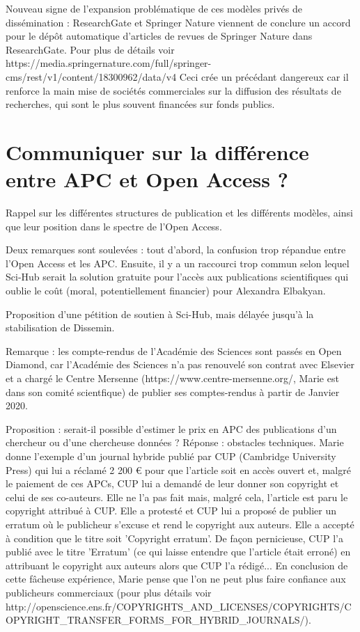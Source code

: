 \documentclass[a4paper]{article}
\begin{document}
Nouveau signe de l'expansion problématique de ces modèles privés de dissémination : ResearchGate et Springer Nature viennent de conclure un accord pour le dépôt automatique d'articles de revues de Springer Nature dans ResearchGate. Pour plus de détails voir https://media.springernature.com/full/springer-cms/rest/v1/content/18300962/data/v4
Ceci crée un précédant dangereux car il renforce la main mise de sociétés commerciales sur la diffusion des résultats de recherches, qui sont le plus souvent financées sur fonds publics.

\section{Communiquer sur la différence entre APC et Open Access ?}

Rappel sur les différentes structures de publication et les différents modèles, ainsi que leur position dans le spectre de l'Open Access.

Deux remarques sont soulevées : tout d'abord, la confusion trop répandue entre l'Open Access et les APC. Ensuite, il y a un raccourci trop commun selon lequel Sci-Hub serait la solution gratuite pour l'accès aux publications scientifiques qui oublie le coût (moral, potentiellement financier) pour Alexandra Elbakyan. 

Proposition d'une pétition de soutien à Sci-Hub, mais délayée jusqu'à la stabilisation de Dissemin. 

Remarque : les compte-rendus de l'Académie des Sciences sont passés en Open Diamond, car l'Académie des Sciences n'a pas renouvelé son contrat avec Elsevier et a chargé le Centre Mersenne (https://www.centre-mersenne.org/, Marie est dans son comité scientfique) de publier ses comptes-rendus à partir de Janvier 2020.

Proposition : serait-il possible d'estimer le prix en APC des publications d'un chercheur ou d'une chercheuse données ? Réponse : obstacles techniques.
Marie donne l'exemple d'un journal hybride publié par CUP (Cambridge University Press) qui lui a réclamé 2 200 € pour que l'article soit en accès ouvert et, malgré le paiement de ces APCs, CUP lui a demandé de leur donner son copyright et celui de ses co-auteurs. Elle ne l'a pas fait mais, malgré cela, l'article est paru le copyright attribué à CUP. Elle a protesté et CUP lui a proposé de publier un erratum où le publicheur s'excuse et rend le copyright aux auteurs. Elle a accepté à condition que le titre soit 'Copyright erratum'. De façon pernicieuse, CUP l'a publié avec le titre 'Erratum' (ce qui laisse entendre que l'article était erroné) en attribuant le copyright aux auteurs alors que CUP l'a rédigé... En conclusion de cette fâcheuse expérience, Marie pense que l'on ne peut plus faire confiance aux publicheurs commerciaux (pour plus détails voir http://openscience.ens.fr/COPYRIGHTS_AND_LICENSES/COPYRIGHTS/COPYRIGHT_TRANSFER_FORMS_FOR_HYBRID_JOURNALS/). 
\end{document}
